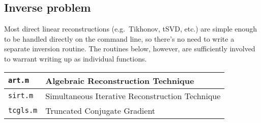\documentclass[12pt]{article}
\newcommand{\pmifile}[1]{{\tt #1}}
\begin{document}
\subsection{Inverse problem}

Most direct linear reconstructions (e.g.\ Tikhonov, tSVD, etc.) are
simple enough to be handled directly on the command line, so there's
no need to write a separate inversion routine.  The routines below,
however, are sufficiently involved to warrant writing up as individual
functions.

\noindent
\begin{tabular}{|l|l|}
\hline
\pmifile{art.m}   & Algebraic Reconstruction Technique \\ \hline
\pmifile{sirt.m}  & Simultaneous Iterative Reconstruction Technique \\ \hline
\pmifile{tcgls.m} & Truncated Conjugate Gradient \\ \hline
\end{tabular}
\end{document}
